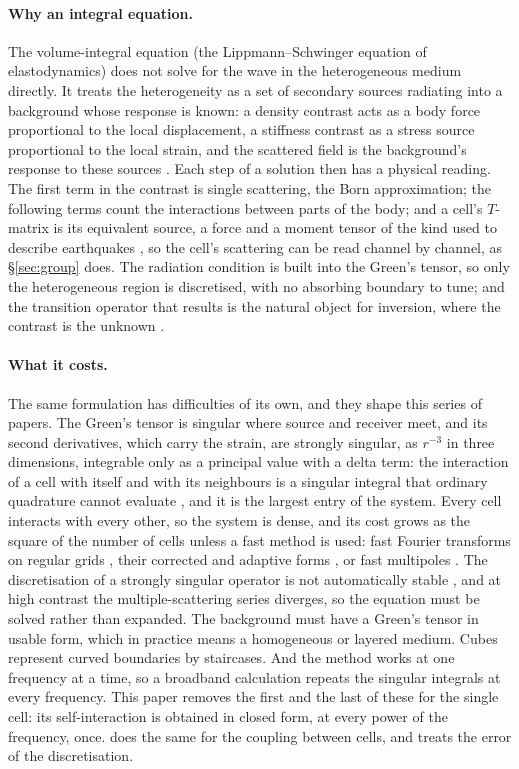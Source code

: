 \documentclass[11pt,a4paper]{article}
\begin{document}
\paragraph{Why an integral equation.} The volume-integral equation (the Lippmann--Schwinger equation of
elastodynamics) does not solve for the wave in the heterogeneous medium directly. It treats the
heterogeneity as a set of secondary sources radiating into a background whose response is known: a
density contrast acts as a body force proportional to the local displacement, a stiffness contrast as a
stress source proportional to the local strain, and the scattered field is the background's response to
these sources \citep{Gubernatis1977,WuAki1985}. Each step of a solution then has a physical reading. The
first term in the contrast is single scattering, the Born approximation; the following terms count the
interactions between parts of the body; and a cell's $T$-matrix is its equivalent source, a force and a
moment tensor of the kind used to describe earthquakes \citep{Aki2002}, so the cell's scattering can be
read channel by channel, as \S\ref{sec:group} does. The radiation condition is built into the Green's
tensor, so only the heterogeneous region is discretised, with no absorbing boundary to tune; and the
transition operator that results is the natural object for inversion, where the contrast is the unknown
\citep{Jakobsen2012,Jakobsen2020}.

\paragraph{What it costs.} The same formulation has difficulties of its own, and they shape this series
of papers. The Green's tensor is singular where source and receiver meet, and its second derivatives,
which carry the strain, are strongly singular, as $r^{-3}$ in three dimensions, integrable only as a principal
value with a delta term: the interaction of a cell with itself and with its neighbours
is a singular integral that ordinary quadrature cannot evaluate \citep{Duffy1982}, and it is the largest
entry of the system. Every cell interacts with every other, so the system is dense, and its cost grows as
the square of the number of cells unless a fast method is used: fast Fourier transforms on regular grids
\citep{Yang2008,Touhei2011}, their corrected and adaptive forms \citep{Phillips1997,Bleszynski1996}, or
fast multipoles \citep{Chaillat2008}. The discretisation of a strongly singular operator is not
automatically stable \citep{Costabel2023}, and at high contrast the multiple-scattering series diverges,
so the equation must be solved rather than expanded. The background must have a Green's tensor in usable
form, which in practice means a homogeneous or layered medium. Cubes represent curved boundaries by
staircases. And the method works at one frequency at a time, so a broadband calculation repeats the
singular integrals at every frequency. This paper removes the first and the last of these for the single
cell: its self-interaction is obtained in closed form, at every power of the frequency, once.
\citet{NestorCoupling2026} does the same for the coupling between cells, and \citet{NestorError2026}
treats the error of the discretisation.
\end{document}
